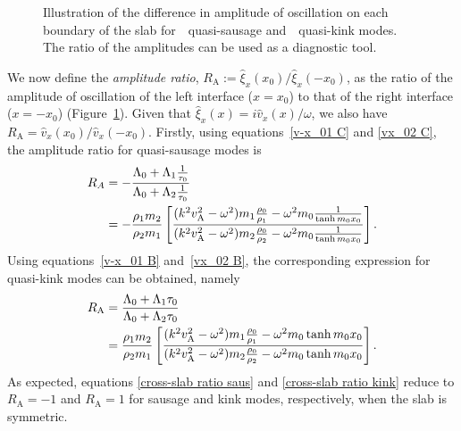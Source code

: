 \documentclass[namedreferences]{solarphysics}
\numberwithin{equation}{section}
\begin{document}
\begin{article}
\begin{figure}
{{{ 
}\label{fig: RA kink}}}
\caption{Illustration of the difference in amplitude of oscillation on each boundary of the slab for~\protect{}~quasi-sausage and~\protect{}~quasi-kink modes. The ratio of the amplitudes can be used as a diagnostic tool.}
\label{fig: RA}
\end{figure}

We now define the \emph{amplitude ratio}, $R_\textrm{A} := \widehat{\xi}_x(x_0) / \widehat{\xi}_x(-x_0)$, as the ratio of the amplitude of oscillation of the left interface ($x=x_0$) to that of the right interface ($x=-x_0$) (Figure~\ref{fig: RA}). Given that ${\widehat{\xi}_x(x) = i\widehat{v}_x(x) / \omega}$, we also have $R_\textrm{A} = \widehat{v}_x(x_0) / \widehat{v}_x(-x_0)$. Firstly, using equations~\eqref{v-x_01 C} and \eqref{vx_02 C}, the amplitude ratio for quasi-sausage modes is
\begin{align}
R_A &=-\frac{\Lambda_0+\Lambda_1\frac{1}{\tau_0}}{\Lambda_0+\Lambda_2\frac{1}{\tau_0}} \notag \\
	&=-\frac{\rho_1m_2}{\rho_2m_1}\left[\frac{(k^2v_\textrm{A}^2-\omega^2)m_1\frac{\rho_0}{\rho_1}-\omega^2m_0\frac{1}{\tanh{m_0x_0}}}{(k^2v_\textrm{A}^2-\omega^2)m_2\frac{\rho_0}{\rho_2}-\omega^2m_0\frac{1}{\tanh{m_0x_0}}}\right]. \label{cross-slab ratio saus}
\end{align}
Using equations~\eqref{v-x_01 B} and~\eqref{vx_02 B}, the corresponding expression for quasi-kink modes can be obtained, namely
\begin{align}
R_\textrm{A}&=\frac{\Lambda_0+\Lambda_1\tau_0}{\Lambda_0+\Lambda_2\tau_0} \notag \\
	&=\frac{\rho_1m_2}{\rho_2m_1}\left[\frac{(k^2v_\textrm{A}^2-\omega^2)m_1\frac{\rho_0}{\rho_1}-\omega^2m_0\tanh{m_0x_0}}{(k^2v_\textrm{A}^2-\omega^2)m_2\frac{\rho_0}{\rho_2}-\omega^2m_0\tanh{m_0x_0}}\right]. \label{cross-slab ratio kink}
\end{align}
As expected, equations \eqref{cross-slab ratio saus} and \eqref{cross-slab ratio kink} reduce to $R_\textrm{A} = -1$ and $R_\textrm{A} = 1$ for sausage and kink modes, respectively, when the slab is symmetric.


\end{article}
\end{document}
